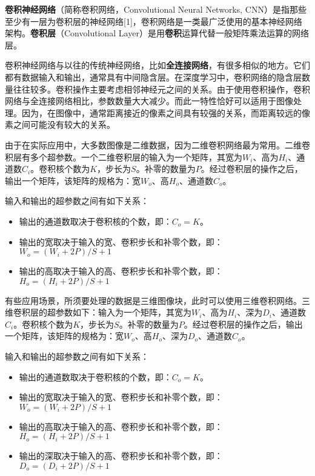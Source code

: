 

\textbf{卷积神经网络}（简称卷积网络，Convolutional Neural Networks, CNN）是指那些至少有一层为卷积层的神经网络[1]，卷积网络是一类最广泛使用的基本神经网络架构。\textbf{卷积层}（Convolutional Layer）是用\textbf{卷积}运算代替一般矩阵乘法运算的网络层。

卷积神经网络与以往的传统神经网络，比如\textbf{全连接网络}，有很多相似的地方。它们都有数据输入和输出，通常具有中间隐含层。在深度学习中，卷积网络的隐含层数量往往较多。卷积操作主要考虑相邻神经元之间的关系。由于使用卷积操作，卷积网络与全连接网络相比，参数数量大大减少。而此一特性恰好可以适用于图像处理。因为，在图像中，通常距离接近的像素之间具有较强的关系，而距离较远的像素之间可能没有较大的关系。

由于在实际应用中，大多数图像是二维数据，因为二维卷积网络最为常用。二维卷积层有多个超参数。一个二维卷积层的输入为一个矩阵，其宽为$W_i$、高为$H_i$、通道数$C_i$。卷积核个数为$K$，步长为$S$。补零的数量为$P$。经过卷积层的操作之后，输出一个矩阵，该矩阵的规格为：宽$W_o$、高$H_o$、通道数$C_o$。

输入和输出的超参数之间有如下关系： \\
\begin{itemize}
\item 输出的通道数取决于卷积核的个数，即：$C_o=K$。
\item 输出的宽取决于输入的宽、卷积步长和补零个数，即：$W_o=(W_i+2P)/S+1$
\item 输出的高取决于输入的高、卷积步长和补零个数，即：$H_o=(H_i+2P)/S+1$
\end{itemize}

有些应用场景，所须要处理的数据是三维图像块，此时可以使用三维卷积网络。三维卷积层的超参数如下：输入为一个矩阵，其宽为$W_i$、高为$H_i$、深为$D_i$、通道数$C_i$。卷积核个数为$K$，步长为$S$。补零的数量为$P$。经过卷积层的操作之后，输出一个矩阵，该矩阵的规格为：宽$W_o$、高$H_o$、深为$D_o$、通道数$C_o$。

输入和输出的超参数之间有如下关系： \\
\begin{itemize}
\item 输出的通道数取决于卷积核的个数，即：$C_o=K$。
\item 输出的宽取决于输入的宽、卷积步长和补零个数，即：$W_o=(W_i+2P)/S+1$
\item 输出的高取决于输入的高、卷积步长和补零个数，即：$H_o=(H_i+2P)/S+1$
\item 输出的深取决于输入的高、卷积步长和补零个数，即：$D_o=(D_i+2P)/S+1$
\end{itemize}

